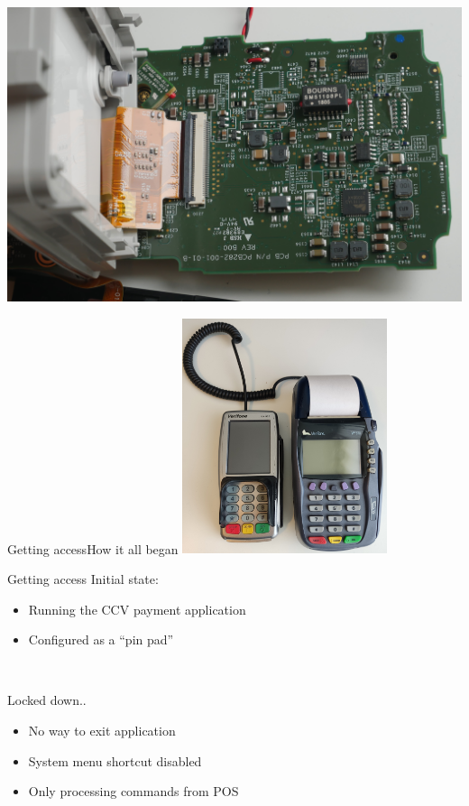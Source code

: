 \documentclass[12pt,aspectratio=169]{beamer}
\begin{document}
\begin{frame}
\centering
\includegraphics[width=14cm]{media/pcb_under_screen}
\end{frame}


\begin{frame}{Getting access}{How it all began}
\centering
\includegraphics[width=6cm]{media/vx820_with_vx570}
\end{frame}



\begin{frame}{Getting access}
Initial state:
\begin{itemize}
	\item Running the CCV payment application
	\item Configured as a ``pin pad''
\end{itemize}

~

Locked down..
\begin{itemize}
	\item No way to exit application
	\item System menu shortcut disabled
	\item Only processing commands from POS
\end{itemize}
\end{frame}
\end{document}
